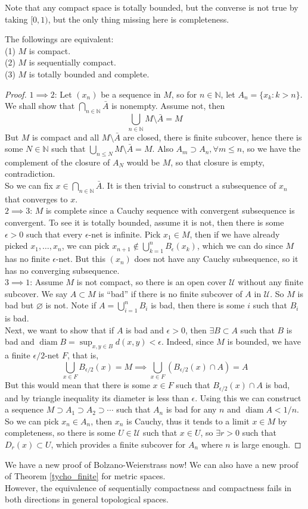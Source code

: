 Note that any compact space is totally bounded, but the converse is not true by taking $[0,1)$, but the only thing missing here is completeness.
\begin{theorem}
    The followings are equivalent:\\
    (1) $M$ is compact.\\
    (2) $M$ is sequentially compact.\\
    (3) $M$ is totally bounded and complete.
\end{theorem}
\begin{proof}
    $1\implies 2$: Let $(x_n)$ be a sequence in $M$, so for $n\in\mathbb N$, let $A_n=\{x_k:k>n\}$.
    We shall show that $\bigcap_{n\in\mathbb N}\bar{A}$ is nonempty.
    Assume not, then
    $$\bigcup_{n\in\mathbb N}M\setminus\bar{A}=M$$
    But $M$ is compact and all $M\setminus\bar{A}$ are closed, there is finite subcover, hence there is some $N\in\mathbb N$ such that $\bigcup_{n\le N}M\setminus\bar{A}=M$.
    Also $A_m\supset A_n,\forall m\le n$, so we have the complement of the closure of $A_{N}$ would be $M$, so that closure is empty, contradiction.\\
    So we can fix $x\in \bigcap_{n\in\mathbb N}\bar{A}$.
    It is then trivial to construct a subsequence of $x_n$ that converges to $x$.\\
    $2\implies 3$: $M$ is complete since a Cauchy sequence with convergent subsequence is convergent.
    To see it is totally bounded, assume it is not, then there is some $\epsilon>0$ such that every $\epsilon$-net is infinite.
    Pick $x_1\in M$, then if we have already picked $x_1,\ldots,x_n$, we can pick $x_{n+1}\notin \bigcup_{k=1}^nB_\epsilon(x_k)$, which we can do since $M$ has no finite $\epsilon$-net.
    But this $(x_n)$ does not have any Cauchy subsequence, so it has no converging subsequence.\\
    $3\implies 1$: Assume $M$ is not compact, so there is an open cover $\mathscr U$ without any finite subcover.
    We say $A\subset M$ is ``bad'' if there is no finite subcover of $A$ in $\mathscr U$.
    So $M$ is bad but $\varnothing$ is not.
    Note if $A=\bigcup_{i=1}^nB_i$ is bad, then there is some $i$ such that $B_i$ is bad.\\
    Next, we want to show that if $A$ is bad and $\epsilon>0$, then $\exists B\subset A$ such that $B$ is bad and $\operatorname{diam}B=\sup_{x,y\in B}d(x,y)<\epsilon$.
    Indeed, since $M$ is bounded, we have a finite $\epsilon/2$-net $F$, that is,
    $$\bigcup_{x\in F}B_{\epsilon/2}(x)=M\implies \bigcup_{x\in F}(B_{\epsilon/2}(x)\cap A)=A$$
    But this would mean that there is some $x\in F$ such that $B_{\epsilon/2}(x)\cap A$ is bad, and by triangle inequality its diameter is less than $\epsilon$.
    Using this we can construct a sequence $M\supset A_1\supset A_2\supset\cdots$ such that $A_n$ is bad for any $n$ and $\operatorname{diam}A<1/n$.
    So we can pick $x_n\in A_n$, then $x_n$ is Cauchy, thus it tends to a limit $x\in M$ by completeness, so there is some $U\in\mathscr U$ such that $x\in U$, so $\exists r>0$ such that $D_r(x)\subset U$, which provides a finite subcover for $A_n$ where $n$ is large enough.
\end{proof}
\begin{remark}
    We have a new proof of Bolzano-Weierstrass now!
    We can also have a new proof of Theorem \ref{tycho_finite} for metric spaces.\\
    However, the equivalence of sequentially compactness and compactness fails in both directions in general topological spaces.
\end{remark}